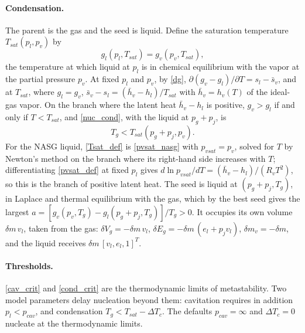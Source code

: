 \paragraph{Condensation.}
The parent is the gas and the seed is liquid. Define the saturation temperature $T_{sat}(p_l,p_v)$ by
\begin{equation}\label{Tsat_def}
g_l(p_l,T_{sat})=g_v(p_v,T_{sat}),
\end{equation}
the temperature at which liquid at $p_l$ is in chemical equilibrium with the vapor at the partial pressure $p_v$. At fixed $p_l$ and $p_v$, by \eqref{dg}, $\partial(g_v-g_l)/\partial T=s_l-\bar s_v$, and at $T_{sat}$, where $g_l=g_v$, $\bar s_v-s_l=(\bar h_v-h_l)/T_{sat}$ with $\bar h_v=h_v(T)$ of the ideal-gas vapor. On the branch where the latent heat $\bar h_v-h_l$ is positive, $g_v>g_l$ if and only if $T<T_{sat}$, and \eqref{nuc_cond}, with the liquid at $p_g+p_{j}$, is
\begin{equation}\label{cond_crit}
T_g<T_{sat}(p_g+p_{j},p_v).
\end{equation}
For the NASG liquid, \eqref{Tsat_def} is \eqref{pvsat_nasg} with $p_{vsat}=p_v$, solved for $T$ by Newton's method on the branch where its right-hand side increases with $T$; differentiating \eqref{pvsat_def} at fixed $p_l$ gives $d\ln p_{vsat}/dT=(\bar h_v-h_l)/(R_vT^2)$, so this is the branch of positive latent heat. The seed is liquid at $(p_g+p_{j},T_g)$, in Laplace and thermal equilibrium with the gas, which by the best seed gives the largest $a=[g_v(p_v,T_g)-g_l(p_g+p_{j},T_g)]/T_g>0$. It occupies its own volume $\delta m\,v_l$, taken from the gas: $\delta V_g=-\delta m\,v_l$, $\delta E_g=-\delta m\,(e_l+p_{j}v_l)$, $\delta m_v=-\delta m$, and the liquid receives $\delta m\,[v_l,e_l,1]^T$.

\paragraph{Thresholds.}
\eqref{cav_crit} and \eqref{cond_crit} are the thermodynamic limits of metastability. Two model parameters delay nucleation beyond them: cavitation requires in addition $p_l<p_{cav}$, and condensation $T_g<T_{sat}-\Delta T_c$. The defaults $p_{cav}=\infty$ and $\Delta T_c=0$ nucleate at the thermodynamic limits.

